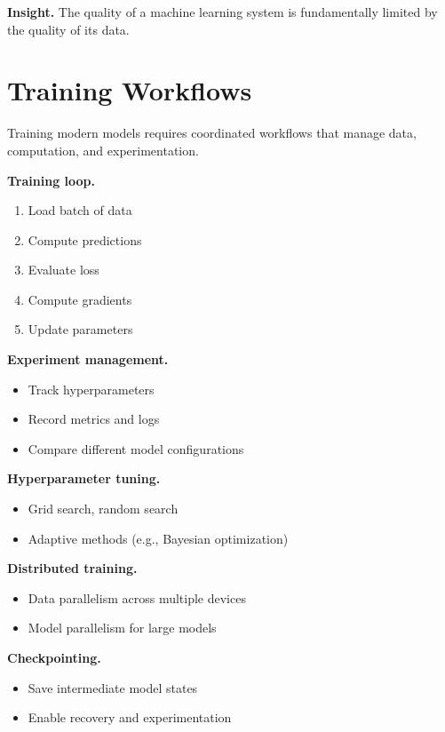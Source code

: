 \medskip

\noindent
\textbf{Insight.}  
The quality of a machine learning system is fundamentally limited by the quality of its data.

\section{Training Workflows}

Training modern models requires coordinated workflows that manage data, computation, and experimentation.

\medskip

\noindent
\textbf{Training loop.}
\begin{enumerate}
    \item Load batch of data
    \item Compute predictions
    \item Evaluate loss
    \item Compute gradients
    \item Update parameters
\end{enumerate}

\medskip

\noindent
\textbf{Experiment management.}
\begin{itemize}
    \item Track hyperparameters
    \item Record metrics and logs
    \item Compare different model configurations
\end{itemize}

\medskip

\noindent
\textbf{Hyperparameter tuning.}
\begin{itemize}
    \item Grid search, random search
    \item Adaptive methods (e.g., Bayesian optimization)
\end{itemize}

\medskip

\noindent
\textbf{Distributed training.}
\begin{itemize}
    \item Data parallelism across multiple devices
    \item Model parallelism for large models
\end{itemize}

\medskip

\noindent
\textbf{Checkpointing.}
\begin{itemize}
    \item Save intermediate model states
    \item Enable recovery and experimentation
\end{itemize}

